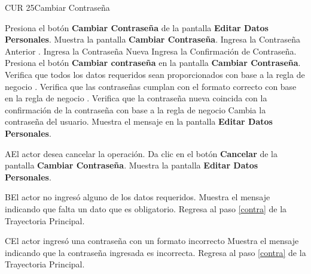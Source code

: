 \begin{UseCase}{CUR 25}{Cambiar Contraseña}
{\begin{UClist}
	    \end{UClist}
	}
 \end{UseCase}

 \begin{UCtrayectoria}
 	
 	\UCpaso [\UCactor] Presiona el botón \textbf{Cambiar Contraseña} de la pantalla \textbf{Editar Datos Personales}.
 	\UCpaso Muestra la pantalla \textbf{Cambiar Contraseña}.
 	\UCpaso [\UCactor] Ingresa la Contraseña Anterior . \label{contra}
 	\UCpaso [\UCactor] Ingresa la Contraseña Nueva 
 	\UCpaso [\UCactor]Ingresa la Confirmación de Contraseña.
 	\UCpaso [\UCactor] Presiona el botón \textbf{Cambiar contraseña} en la pantalla \textbf{Cambiar Contraseña}.
 	\UCpaso Verifica que todos los datos requeridos sean proporcionados con base a la regla de negocio .
 	\UCpaso Verifica que las contraseñas cumplan con el formato correcto con base en la regla de negocio .
 	\UCpaso Verifica que la contraseña nueva coincida con la confirmación de la contraseña con base a la regla de negocio 
 	\UCpaso Cambia la contraseña del usuario.
 	\UCpaso Muestra el mensaje  en la pantalla \textbf{Editar Datos Personales}.
     
 \end{UCtrayectoria}

 \begin{UCtrayectoriaA}{A}{El actor desea cancelar la operación.}
 	\UCpaso [\UCactor] Da clic en el botón \textbf{Cancelar} de la pantalla \textbf{Cambiar Contraseña}.
 	\UCpaso Muestra la pantalla \textbf{Editar Datos Personales}.
    
 \end{UCtrayectoriaA}

 \begin{UCtrayectoriaA}{B}{El actor no ingresó alguno de los datos requeridos.}
	\UCpaso [\UCactor] Muestra el mensaje  indicando que falta un dato que es obligatorio.
	\UCpaso Regresa al paso \ref{contra} de la Trayectoria Principal.
	
\end{UCtrayectoriaA} 

\begin{UCtrayectoriaA}{C}{El actor ingresó una contraseña con un formato incorrecto}
	\UCpaso [\UCactor] Muestra el mensaje  indicando que la contraseña ingresada es incorrecta.
	\UCpaso Regresa al paso \ref{contra} de la Trayectoria Principal.
	
\end{UCtrayectoriaA} 


